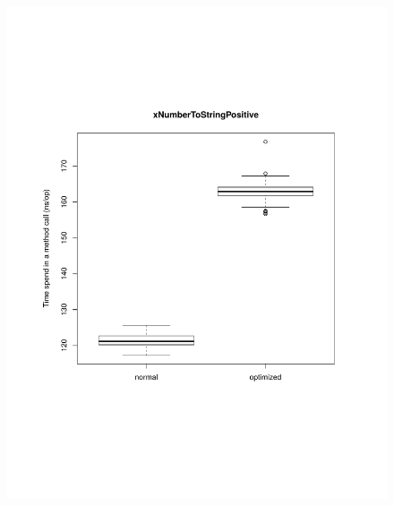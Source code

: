 \begin{figure}[H]
	\centering

	\centerline{
		\includegraphics[trim=0mm 60mm 20mm 50mm,scale=0.50]{pictures/boxplot_xNumberToStringPositive.pdf}
}
\end{figure}
